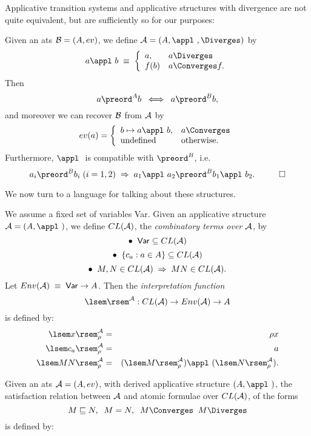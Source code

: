 Applicative transition systems and applicative structures with divergence are not quite equivalent, but are sufficiently so for our purposes:
\begin{proposition}
\label{appstruct}
Given an ats ${\cal B} = (A, ev)$, we define ${\cal A} = (A, \appl\ , \Diverges)$ by
\[ a\appl\ b \; \equiv \; \left\{ \begin{array}{ll}
a, & a \Diverges \\
f(b) & a \Converges f .
\end{array} \right. \]
Then 
\[ a \preord^{A} b \;\; \Longleftrightarrow \;\; a \preord^{B} b , \]
and moreover we can recover ${\cal B}$ from ${\cal A}$ by
\[ ev(a) =  \left\{ \begin{array}{ll}
b \mapsto a\appl\ b, & a \Converges \\
\mbox{undefined} & \mbox{otherwise.}
\end{array} \right. \]
Furthermore, $\appl\ $ is compatible with $\preord^{B}$, i.e.
\[ a_{i} \preord^{B} b_{i} \; (i = 1,2) \; \Rightarrow \; a_{1}\appl\ a_{2} \preord^{B} b_{1}\appl\ b_{2} . \;\;\; \qed \]
\end{proposition}
We now turn to a language for talking about these structures.
\begin{definition}
{\rm We assume a fixed set of variables {\sf Var}. Given an applicative structure ${\cal A} = (A, \appl\ )$, we define $CL({\cal A})$, the {\em combinatory terms over ${\cal A}$}, by
\[ \bullet \;\; {\sf Var} \subseteq CL({\cal A}) \]
\[ \bullet \;\; \{ c_{a} : a \in A \} \subseteq CL({\cal A}) \]
\[ \bullet \;\; M, N \in CL({\cal A}) \; \Rightarrow \; MN \in CL({\cal A}) . \]
Let $Env({\cal A}) \; \equiv \; {\sf Var} \rightarrow A$. Then the {\em interpretation function}
\[ \lsem \rsem^{{\cal A}} : CL({\cal A}) \rightarrow Env({\cal A}) \rightarrow A \]
is defined by:}
\begin{eqnarray*}
\lsem x \rsem^{{\cal A}}_{\rho} & = & \rho x \\
\lsem c_{a} \rsem^{{\cal A}}_{\rho} & = & a \\
\lsem MN \rsem^{{\cal A}}_{\rho} & = & (\lsem M \rsem^{{\cal A}}_{\rho})\appl\ (\lsem N \rsem^{{\cal A}}_{\rho}) .
\end{eqnarray*}
\end{definition}
Given an ats ${\cal A} = (A, ev)$, with derived applicative structure $(A, \appl\ )$, the satisfaction relation between ${\cal A}$ and atomic formulae over $CL({\cal A})$, of the forms
\[ M \sqsubseteq N, \;\; M = N, \;\; M \Converges \;\; M \Diverges \]
is defined by:
